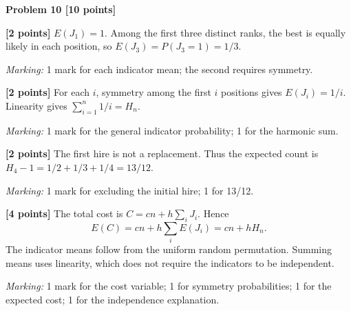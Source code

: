 \documentclass[12pt,letterpaper]{article}
\newcommand{\problemheading}[2][5\baselineskip]{\Needspace{#1}\par\noindent\hspace*{-0.625in}\textbf{#2}\par\nobreak\vspace{0.3em}}
\begin{document}
\vspace{0.65em}
\problemheading[\dimexpr 3\baselineskip+4\baselineskip\relax]{Problem 10 [10 points]}
\begin{description}[font=\normalfont,leftmargin=1.2em,labelsep=0.4em]
\item[(a)] \textbf{[2 points]} $E(J_1)=1$. Among the first three distinct ranks, the best is equally likely in each position, so $E(J_3)=P(J_3=1)=1/3$.
\par\textit{Marking:} 1 mark for each indicator mean; the second requires symmetry.
\item[(b)] \textbf{[2 points]} For each $i$, symmetry among the first $i$ positions gives $E(J_i)=1/i$. Linearity gives $\sum_{i=1}^n1/i=H_n$.
\par\textit{Marking:} 1 mark for the general indicator probability; 1 for the harmonic sum.
\item[(c)] \textbf{[2 points]} The first hire is not a replacement. Thus the expected count is $H_4-1=1/2+1/3+1/4=13/12$.
\par\textit{Marking:} 1 mark for excluding the initial hire; 1 for 13/12.
\item[(d)] \textbf{[4 points]} The total cost is $C=cn+h\sum_iJ_i$. Hence\[E(C)=cn+h\sum_iE(J_i)=cn+hH_n.\]The indicator means follow from the uniform random permutation. Summing means uses linearity, which does not require the indicators to be independent.
\par\textit{Marking:} 1 mark for the cost variable; 1 for symmetry probabilities; 1 for the expected cost; 1 for the independence explanation.
\end{description}
\end{document}
